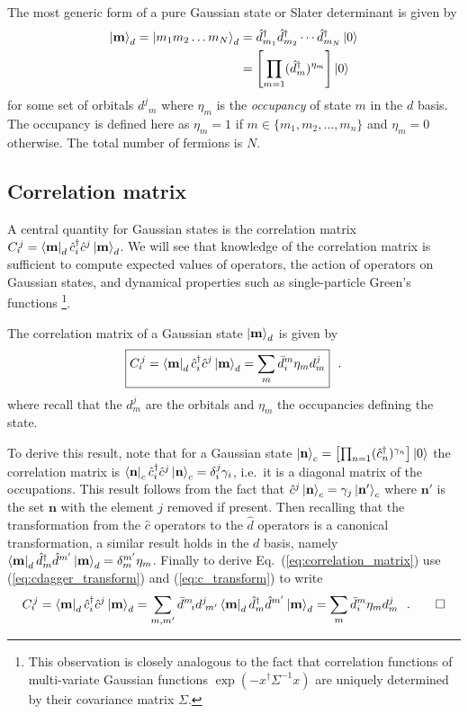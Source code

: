 \documentclass[aps, superscriptaddress, floatfix, onecolumn]{revtex4-2}
\begin{document}
The most generic form of a pure Gaussian state or Slater determinant is given by
\begin{align}
\ket{\mathbf{m}}_d = \ket{m_1 m_2 \ldots m_{N}}_d & = \hat{d}^\dagger_{m_1} \hat{d}^\dagger_{m_2} \cdots \hat{d}^\dagger_{m_{N}} \ket{0} \\
& = \left[ \prod_{m=1} (\hat{d}^\dagger_{m})^{\eta_m} \right] \ket{0}
\end{align}
for some set of orbitals $d^j\!_m$ where $\eta_m$ is the \emph{occupancy} of state $m$ in the $d$ basis. The occupancy is defined here as $\eta_m = 1$ if $m \in \{m_1, m_2, \ldots, m_n\}$ and $\eta_m = 0$ otherwise. The total number of fermions is $N$.

\subsection{Correlation matrix}

A central quantity for Gaussian states is the correlation matrix $C_i\!^j = \bra{\mathbf{m}}_d  \hat{c}^\dagger_i \hat{c}^j \ket{\mathbf{m}}_d $. We will see  that knowledge of the correlation matrix is sufficient to compute expected values of operators, the action
of operators on Gaussian states, and dynamical properties such as single-particle Green's functions \footnote{This observation is closely analogous to the fact that  correlation functions of multi-variate Gaussian functions $\exp(- x^\dagger \Sigma^{-1} x)$ are uniquely determined by their covariance matrix $\Sigma$.}.

The correlation matrix of a Gaussian state $\ket{\mathbf{m}}_d$ is given by
\begin{align}
\boxed{C_i\!^j =  \bra{\mathbf{m}}_d  \hat{c}^\dagger_i \hat{c}^j \ket{\mathbf{m}}_d = \sum_m \bar{d}_i^m \eta_m d^j_m} \ \ . \label{eq:correlation_matrix}
\end{align}
where recall that the $d^j_m$ are the orbitals and $\eta_m$ the occupancies defining the state.

To derive this result, note that for a Gaussian state $\ket{\mathbf{n}}_c  = \left[ \prod_{n=1} (\hat{c}^\dagger_{n})^{\gamma_n} \right] \ket{0}$
the correlation matrix is \mbox{$\bra{\mathbf{n}}_c \hat{c}^\dagger_i \hat{c}^j  \ket{\mathbf{n}}_c = \delta_i^j \gamma_i$}, i.e.\ it is a diagonal matrix of the occupations.
This result follows from the fact
that $\hat{c}^j  \ket{\mathbf{n}}_c = \gamma_j \ket{\mathbf{n'}}_c$ where $\mathbf{n'}$ is the set $\mathbf{n}$ with the element $j$ removed if present.
Then recalling that the transformation from the $\hat{c}$ operators to the $\hat{d}$ operators is a canonical transformation, a similar
result holds in the $d$ basis, namely $\bra{\mathbf{m}}_d \hat{d}^\dagger_m \hat{d}^{m'}  \ket{\mathbf{m}}_d = \delta_m^{m'} \eta_m$.
Finally to derive Eq.~(\ref{eq:correlation_matrix}) use (\ref{eq:cdagger_transform}) and (\ref{eq:c_transform}) to write 
\begin{align}
C_i\!^j = \bra{\mathbf{m}}_d  \hat{c}^\dagger_i \hat{c}^j \ket{\mathbf{m}}_d = \sum_{m,m'} \bar{d}^m\!_i d^j\!_{m'}  \bra{\mathbf{m}}_d  \hat{d}^\dagger_m \hat{d}^{m'} \ket{\mathbf{m}}_d  = \sum_m \bar{d}_i^m \eta_m d^j_m \ \ . \qed
\end{align}
\end{document}
